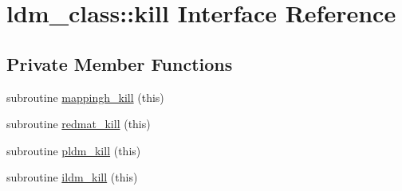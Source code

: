\hypertarget{interfaceldm__class_1_1kill}{\section{ldm\+\_\+class\+:\+:kill Interface Reference}
\label{interfaceldm__class_1_1kill}
}
\subsection*{Private Member Functions}
\begin{DoxyCompactItemize}
\item 
subroutine \hyperlink{interfaceldm__class_1_1kill_a31c606b930e57474a06ee910d68516e6}{mappingh\+\_\+kill} (this)
\item 
subroutine \hyperlink{interfaceldm__class_1_1kill_a7c331a9aa7e677ce395a352051661a15}{redmat\+\_\+kill} (this)
\item 
subroutine \hyperlink{interfaceldm__class_1_1kill_a77469f45cc208e4587c39d4e7bb934c2}{pldm\+\_\+kill} (this)
\item 
subroutine \hyperlink{interfaceldm__class_1_1kill_ad6bcf95904e7f8c0a12fb23fac1ca292}{ildm\+\_\+kill} (this)
\end{DoxyCompactItemize}


